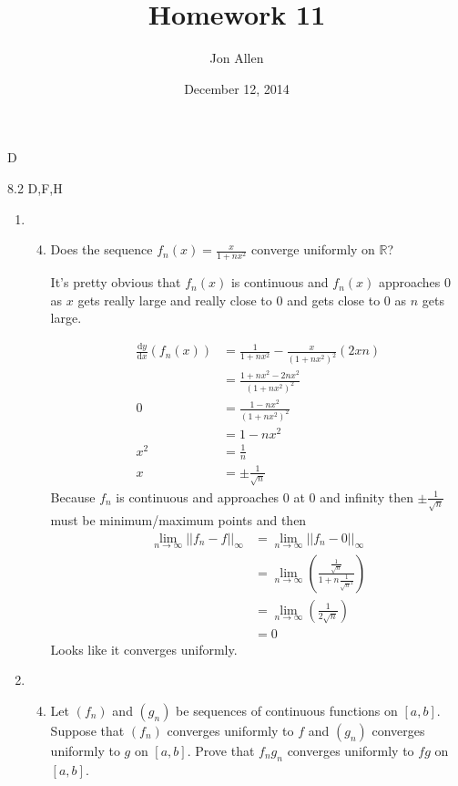 \documentclass[letterpaper]{article}
\begin{document}
\title{Homework 11}
\date{December 12, 2014}
\author{Jon Allen}
 D

8.2 D,F,H
\renewcommand{\labelenumi}{8.\arabic{enumi}}
\renewcommand{\labelenumii}{\Alph{enumii}.}
\renewcommand{\labelenumiii}{(\alph{enumiii})}
\begin{enumerate}
\item
  \begin{enumerate}
  \setcounter{enumii}{3}
  \item
  Does the sequence $\displaystyle f_n(x)=\frac{x}{1+nx^2}$ converge uniformly  on $\mathbb{R}$?

  It's pretty obvious that $f_n(x)$ is continuous and $f_n(x)$ approaches $0$ as $x$ gets really large and really close to $0$ and gets close to $0$ as $n$ gets large.

  \begin{align*}
    \frac{\mathrm{d}y}{\mathrm{d}x}\left(f_n(x)\right)&=\frac{1}{1+nx^2}-\frac{x}{(1+nx^2)^2}(2xn)\\
    &=\frac{1+nx^2-2nx^2}{(1+nx^2)^2}\\
    0&=\frac{1-nx^2}{(1+nx^2)^2}\\
    &=1-nx^2\\
    x^2&=\frac{1}{n}\\
    x&=\pm \frac{1}{\sqrt{n}}
  \end{align*}
  Because $f_n$ is continuous and approaches 0 at 0 and infinity then $\pm \frac{1}{\sqrt{n}}$ must be minimum/maximum points and then
  \begin{align*}
    \lim_{n\to\infty}||f_n-f||_{\infty}&=\lim_{n\to\infty}||f_n-0||_{\infty}\\
    &=\lim_{n\to\infty}\left(\frac{\frac{1}{\sqrt{n}}}{1+n\frac{1}{\sqrt{n}^2}}\right)\\
    &=\lim_{n\to\infty}\left(\frac{1}{2\sqrt{n}}\right)\\
    &=0
  \end{align*}
  Looks like it converges uniformly.
  \end{enumerate}
\item
  \begin{enumerate}
  \setcounter{enumii}{3}
  \item
  Let $(f_n)$ and $(g_n)$ be sequences of continuous functions on $[a,b]$. Suppose that $(f_n)$ converges uniformly to $f$ and $(g_n)$ converges uniformly to $g$ on $[a,b]$. Prove that $f_ng_n$ converges uniformly to $fg$ on $[a,b]$.


\end{enumerate}
\end{enumerate}
\end{document}
